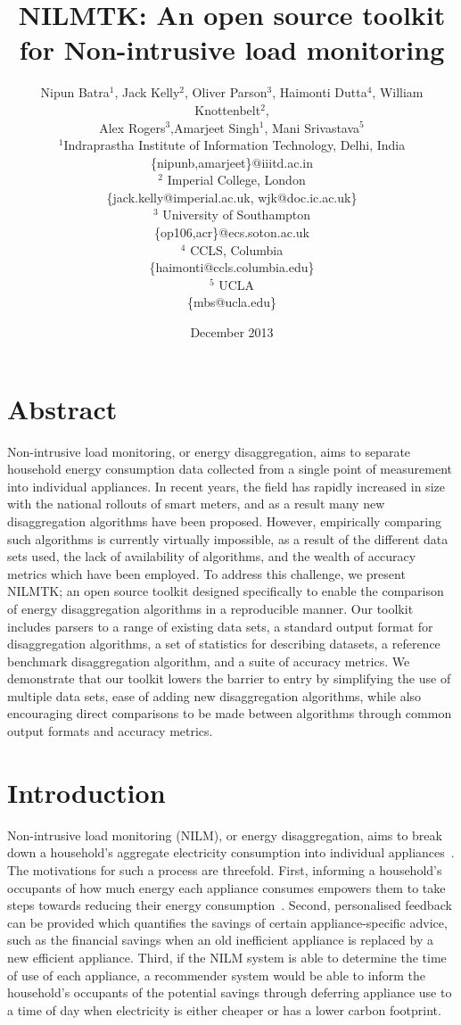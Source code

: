 \documentclass{sig-alternate}
\title{NILMTK: An open source toolkit for Non-intrusive load monitoring}
\author{Nipun Batra$^1$, Jack Kelly$^2$, Oliver Parson$^3$, Haimonti Dutta$^4$, William Knottenbelt$^2$,\\ Alex Rogers$^3$,Amarjeet Singh$^1$, Mani Srivastava$^5$\\
\scriptsize$^1$Indraprastha Institute of Information Technology, Delhi, India\\
\scriptsize\{nipunb,amarjeet\}@iiitd.ac.in\\
\scriptsize$^2$ Imperial College, London\\
\scriptsize\{jack.kelly@imperial.ac.uk, wjk@doc.ic.ac.uk\}\\
\scriptsize$^3$ University of Southampton\\
\scriptsize\{op106,acr\}@ecs.soton.ac.uk\\
\scriptsize$^4$ CCLS, Columbia\\
\scriptsize\{haimonti@ccls.columbia.edu\}\\
\scriptsize$^5$ UCLA\\
\scriptsize\{mbs@ucla.edu\}\\
}
\date{December 2013}
\begin{document}
\maketitle

\section{Abstract}
Non-intrusive load monitoring, or energy disaggregation, aims to separate household energy consumption data collected from a single point of measurement into individual appliances. In recent years, the field has rapidly increased in size with the national rollouts of smart meters, and as a result many new disaggregation algorithms have been proposed. However, empirically comparing such algorithms is currently virtually impossible, as a result of the different data sets used, the lack of availability of algorithms, and the wealth of accuracy metrics which have been employed. To address this challenge, we present NILMTK; an open source toolkit designed specifically to enable the comparison of energy disaggregation algorithms in a reproducible manner. Our toolkit includes parsers to a range of existing data sets, a standard output format for disaggregation algorithms, a set of statistics for describing datasets, a reference benchmark disaggregation algorithm, and a suite of accuracy metrics. We demonstrate that our toolkit lowers the barrier to entry by simplifying the use of multiple data sets, ease of adding new disaggregation algorithms, while also encouraging direct comparisons to be made between algorithms through common output formats and accuracy metrics.

\section{Introduction}
Non-intrusive load monitoring (NILM), or energy disaggregation, aims to break down a household's aggregate electricity consumption into individual appliances~\cite{hart_1992}. The motivations for such a process are threefold. First, informing a household's occupants of how much energy each appliance consumes empowers them to take steps towards reducing their energy consumption~\cite{darby_2006}. Second, 
personalised feedback can be provided which quantifies the savings of certain appliance-specific advice, such as the financial savings when an old inefficient appliance is replaced by a new efficient appliance. Third, if the NILM system is able to determine the time of use of each appliance, a recommender system would be able to inform the household's occupants of the potential savings through deferring appliance use to a time of day when electricity is either cheaper or has a lower carbon footprint.
\end{document}
